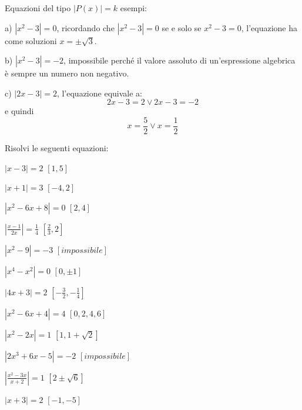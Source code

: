 \begin{esercizio}\label{ese:03.1}
Equazioni del tipo $|P(x)|=k$ esempi:
\begin{enumeratea}
\item[a)] $|x^2-3|=0$, ricordando che $|x^2-3|=0$ se e solo se $x^2-3=0$, 
l'equazione ha come soluzioni $x=\pm\sqrt{3}$.
\item[b)] $|x^2-3|=-2$, impossibile perché il valore assoluto di un'espressione 
algebrica è sempre un numero non negativo.
\item[c)] $|2x-3|=2$, l'equazione equivale a:
$$2x-3=2 \vee 2x-3=-2$$
e quindi
$$x=\frac{5}{2}\vee x=\frac{1}{2}$$
\end{enumeratea}

\noindent Risolvi le seguenti equazioni:

\begin{multicols}{2}
\begin{enumeratea}
\item $|x-3|=2$ \hfill $\left[ 1, 5\right] $
\item $|x+1|=3$ \hfill $\left[ -4, 2\right] $
\item $|x^2-6x+8|=0$ \hfill $\left[ 2, 4\right] $
\item $\left| \frac{x-1}{2x}\right| =\frac{1}{4}$ \hfill $\left[ 
\frac{2}{3}, 2\right] $
\item $|x^2-9|=-3$ \hfill $\left[impossibile \right] $
\item $|x^4-x^2|=0$ \hfill $\left[ 0, \pm 1\right] $
\item $|4x+3|=2$ \hfill $\left[ -\frac{3}{2}, -\frac{1}{4} \right] $
\item $|x^2-6x+4|=4$ \hfill $\left[ 0, 2, 4 , 6 \right] $
\item $|x^2-2x|=1$ \hfill $\left[ 1, 1+\sqrt{2} \right] $
\item $|2x^3+6x-5|=-2$ \hfill $\left[ impossibile \right] $
\item $\left| \frac{x^2-3x}{x+2}\right| =1$ \hfill $\left[ 2\pm 
\sqrt{6} \right] $
\item $|x+3|=2$ \hfill $\left[ -1, -5 \right] $
\end{enumeratea}
\end{multicols}
\end{esercizio}

